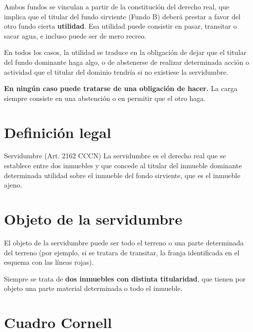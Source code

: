 \documentclass[12pt,oneside]{book}
\begin{document}
Ambos fundos se vinculan a partir de la constitución del derecho real, que implica que el titular del fundo sirviente (Fundo B) deberá prestar a favor del otro fundo cierta \textbf{utilidad}. Esa utilidad puede consistir en pasar, transitar o sacar agua, e incluso puede ser de mero recreo.

En todos los casos, la utilidad se traduce en la obligación de dejar que el titular del fundo dominante haga algo, o de abstenerse de realizar determinada acción o actividad que el titular del dominio tendría si no existiese la servidumbre.

\begin{important}
\textbf{En ningún caso puede tratarse de una obligación de hacer.} La carga siempre consiste en una abstención o en permitir que el otro haga.
\end{important}

\section{Definición legal}

\begin{definition}{Servidumbre (Art. 2162 CCCN)}
La servidumbre es el derecho real que se establece entre dos inmuebles y que concede al titular del inmueble dominante determinada utilidad sobre el inmueble del fondo sirviente, que es el inmueble ajeno.
\end{definition}

\section{Objeto de la servidumbre}

El objeto de la servidumbre puede ser todo el terreno o una parte determinada del terreno (por ejemplo, si se tratara de transitar, la franja identificada en el esquema con las líneas rojas).

Siempre se trata de \textbf{dos inmuebles con distinta titularidad}, que tienen por objeto una parte material determinada o todo el inmueble.

\section{Cuadro Cornell}
\end{document}
